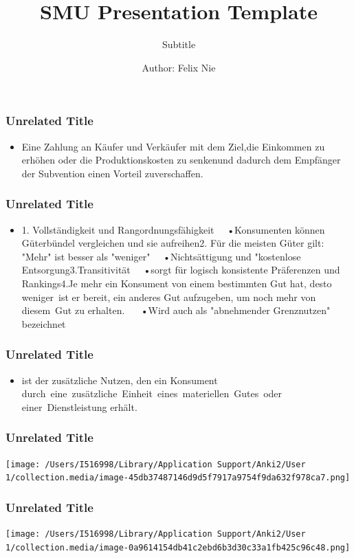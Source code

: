\documentclass[
    11pt,
    aspectratio=169,
]{beamer}
\title[SMU Beamer Template]{SMU Presentation Template}
\subtitle{Subtitle}
\author[For Internal Use]{Author: Felix Nie}
\institute[]{School of Computing and Information Systems \\ \smallskip \textit{email@smu.edu.sg}}
\date[Spring 2023]
\begin{document}
\begin{frame}
\frametitle{Unrelated Title}


\begin{itemize}
\item Eine Zahlung an Käufer und Verkäufer mit dem Ziel,die Einkommen zu erhöhen oder die Produktionskosten zu senkenund dadurch dem Empfänger der Subvention einen Vorteil zuverschaffen.
\end{itemize}

\note[item]{}
\end{frame}
\begin{frame}
\frametitle{Unrelated Title}


\begin{itemize}
\item 1. Vollständigkeit und Rangordnungsfähigkeit   •Konsumenten können Güterbündel vergleichen und sie aufreihen2. Für die meisten Güter gilt: "Mehr" ist besser als "weniger"   •Nichtsättigung und "kostenlose Entsorgung3.Transitivität   •sorgt für logisch konsistente Präferenzen und Rankings4.Je mehr ein Konsument von einem bestimmten Gut hat, desto weniger ist er bereit, ein anderes Gut aufzugeben, um noch mehr von diesem Gut zu erhalten.    •Wird auch als "abnehmender Grenznutzen" bezeichnet
\end{itemize}

\note[item]{}
\end{frame}
\begin{frame}
\frametitle{Unrelated Title}


\begin{itemize}
\item ist der zusätzliche Nutzen, den ein Konsument durch eine zusätzliche Einheit eines materiellen Gutes oder einer Dienstleistung erhält.
\end{itemize}

\note[item]{}
\end{frame}
\begin{frame}
\frametitle{Unrelated Title}

\begin{center}
\texttt{[image: /Users/I516998/Library/Application Support/Anki2/User 1/collection.media/image-45db37487146d9d5f7917a9754f9da632f978ca7.png]}
\end{center}


\note[item]{}
\end{frame}
\begin{frame}
\frametitle{Unrelated Title}

\begin{center}
\texttt{[image: /Users/I516998/Library/Application Support/Anki2/User 1/collection.media/image-0a9614154db41c2ebd6b3d30c33a1fb425c96c48.png]}
\end{center}


\note[item]{}
\end{frame}
\end{document}
